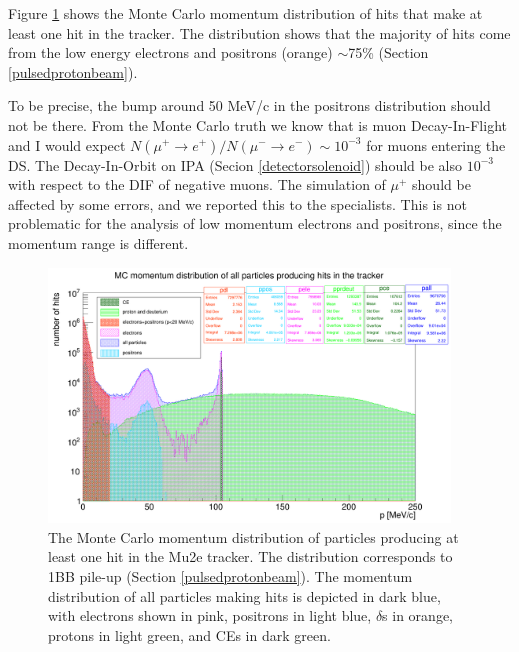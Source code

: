 Figure \ref{fig:momhits} shows the Monte Carlo momentum distribution of hits that make at least 
one hit in the tracker. The distribution shows that the majority of hits come from the low energy 
electrons and positrons (orange) $\sim$75\% (Section \ref{pulsedprotonbeam}).

To be precise, the bump around 50 MeV/c in the positrons distribution should not be there.
From the Monte Carlo truth we know that is muon Decay-In-Flight and 
I would expect $N(\mu^+ \rightarrow e^+ )/N(\mu^- \rightarrow e^- ) \sim 10^{-3}$ for muons entering the DS.
The Decay-In-Orbit on IPA (Secion \ref{detectorsolenoid}) should be also $10^{-3}$ with respect to the DIF of negative muons.
The simulation of $\mu^+$ should be affected by some errors, and we reported this to the specialists.
This is not problematic for the analysis of low momentum electrons and positrons, since the momentum range is 
different.


\begin{figure}[!h]
        \centering
        \includegraphics[width =0.95\textwidth]{figures/png/Screenshot_20240812_152905.png}
    \caption[Monte Carlo momentum distribution of particles producing hits in the Mu2e tracker.]{
       The Monte Carlo momentum distribution of particles producing at 
       least one hit in the Mu2e tracker. The distribution
       corresponds to 1BB pile-up (Section \ref{pulsedprotonbeam}). The momentum distribution 
       of all particles making hits is depicted in dark blue, with electrons 
       shown in pink, positrons in light blue, $\delta$s in orange, protons in 
       light green, and CEs in dark green.
    }
       \label{fig:momhits}
\end{figure}


